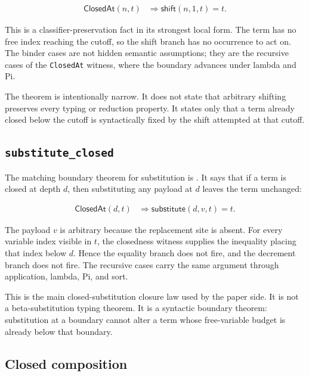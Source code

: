 $$
\begin{aligned}
  \mathsf{ClosedAt}(n,t)
  &\Rightarrow
  \mathsf{shift}(n,1,t)=t.
\end{aligned}
$$

This is a classifier-preservation fact in its strongest local form. The term
has no free index reaching the cutoff, so the shift branch has no occurrence
to act on. The binder cases are not hidden semantic assumptions; they are the
recursive cases of the \texttt{ClosedAt} witness, where the boundary advances
under lambda and Pi.

The theorem is intentionally narrow. It does not state that arbitrary shifting
preserves every typing or reduction property. It states only that a term
already closed below the cutoff is syntactically fixed by the shift attempted
at that cutoff.

\subsection{\texttt{substitute\_closed}}
\label{subsec:metacic-substitution-audit-map-substitute-closed}

The matching boundary theorem for substitution is
. It says that if a term is
closed at depth $d$, then substituting any payload at $d$ leaves the term
unchanged:

$$
\begin{aligned}
  \mathsf{ClosedAt}(d,t)
  &\Rightarrow
  \mathsf{substitute}(d,v,t)=t.
\end{aligned}
$$

The payload $v$ is arbitrary because the replacement site is absent. For every
variable index visible in $t$, the closedness witness supplies the inequality
placing that index below $d$. Hence the equality branch does not fire, and the
decrement branch does not fire. The recursive cases carry the same argument
through application, lambda, Pi, and sort.

This is the main closed-substitution closure law used by the paper side. It
is not a beta-substitution typing theorem. It is a syntactic boundary theorem:
substitution at a boundary cannot alter a term whose free-variable budget is
already below that boundary.

\subsection{Closed composition}
\label{subsec:metacic-substitution-audit-map-closed-composition}

